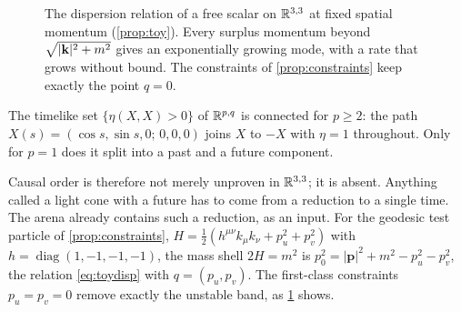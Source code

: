 \begin{figure}[t]
\centering
{}
\caption{The dispersion relation of a free scalar on $\mathbb{R}^{3,3}$ at fixed spatial momentum (\cref{prop:toy}). Every surplus momentum beyond $\sqrt{|\mathbf k|^2+m^2}$ gives
an exponentially growing mode, with a rate that grows without bound. The constraints of \cref{prop:constraints} keep exactly the point $q=0$.}
\label{fig:toy}
\end{figure}

\begin{proposition}
\label{prop:orient}
The timelike set $\{\eta(X,X)>0\}$ of $\mathbb{R}^{p,q}$ is connected for $p\ge2$: the path $X(s)=(\cos s,\sin s,0;\,0,0,0)$ joins $X$ to $-X$ with $\eta=1$ throughout. Only for $p=1$
does it split into a past and a future component.
\end{proposition}

Causal order is therefore not merely unproven in $\mathbb{R}^{3,3}$; it is absent. Anything called a light cone with a future has to come from a reduction to a single
time. The arena already contains such a reduction, as an input. For the geodesic test particle of \cref{prop:constraints}, $H=\tfrac12(h^{\mu\nu}k_\mu k_\nu+p_u^2+p_v^2)$
with $h=\operatorname{diag}(1,-1,-1,-1)$, the mass shell $2H=m^2$ is $p_0^2=|\mathbf p|^2+m^2-p_u^2-p_v^2$, the relation \eqref{eq:toydisp} with $q=(p_u,p_v)$. The
first-class constraints $p_u=p_v=0$ remove exactly the unstable band, as \cref{fig:toy} shows.

